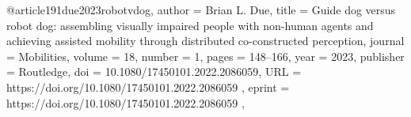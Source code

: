 @article{191due2023robotvdog,
author = {Brian L. Due},
title = {Guide dog versus robot dog: assembling visually impaired people with non-human agents and achieving assisted mobility through distributed co-constructed perception},
journal = {Mobilities},
volume = {18},
number = {1},
pages = {148--166},
year = {2023},
publisher = {Routledge},
doi = {10.1080/17450101.2022.2086059},
URL = { https://doi.org/10.1080/17450101.2022.2086059 },
eprint = { https://doi.org/10.1080/17450101.2022.2086059 },
}